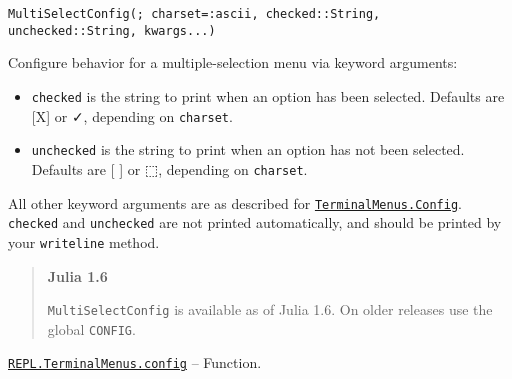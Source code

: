 \begin{adjustwidth}{2em}{0pt}


\begin{verbatim}
MultiSelectConfig(; charset=:ascii, checked::String, unchecked::String, kwargs...)
\end{verbatim}

Configure behavior for a multiple-selection menu via keyword arguments:

\begin{itemize}
\item \texttt{checked} is the string to print when an option has been selected. Defaults are {\textquotedbl}[X]{\textquotedbl} or {\textquotedbl}✓{\textquotedbl}, depending on \texttt{charset}.


\item \texttt{unchecked} is the string to print when an option has not been selected. Defaults are {\textquotedbl}[ ]{\textquotedbl} or {\textquotedbl}⬚{\textquotedbl}, depending on \texttt{charset}.

\end{itemize}
All other keyword arguments are as described for \hyperlink{9206975326561845627}{\texttt{TerminalMenus.Config}}. \texttt{checked} and \texttt{unchecked} are not printed automatically, and should be printed by your \texttt{writeline} method.

\begin{quote}
\textbf{Julia 1.6}

\texttt{MultiSelectConfig} is available as of Julia 1.6. On older releases use the global \texttt{CONFIG}.

\end{quote}


\end{adjustwidth}
\hypertarget{2033177409814489584}{}
\hyperlink{2033177409814489584}{\texttt{REPL.TerminalMenus.config}}  -- {Function.}

